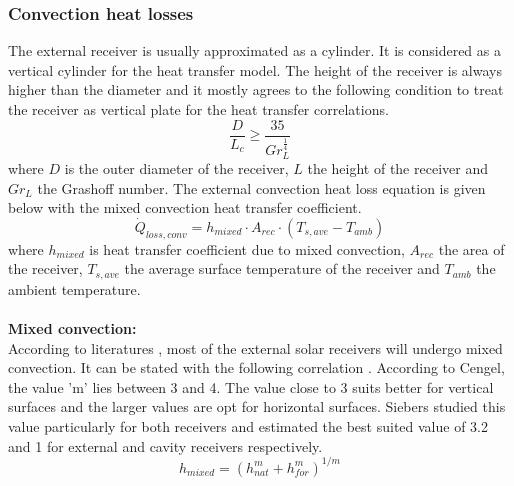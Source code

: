 \subsubsection{Convection heat losses}
The external receiver is usually approximated as a cylinder. It is considered as a vertical cylinder for the heat transfer model. The height of the receiver is always higher than the diameter and it mostly agrees to the following condition to treat the receiver as vertical plate for the heat transfer correlations. 
\begin{equation}
\frac{D}{L_{c}}\ge \frac{35}{Gr_{L}^{\frac{1}{4}}}
\end{equation}
where $D$ is the outer diameter of the receiver, $L$ the height of the receiver and $Gr_{L}$ the Grashoff number. The external convection heat loss equation is given below with the mixed convection heat transfer coefficient. 
\begin{equation}
\dot Q_{loss,conv} = h_{mixed}\cdot A_{rec}\cdot (T_{s,ave}-T_{amb})
\end{equation}
where $h_{mixed}$ is heat transfer coefficient due to mixed convection, $A_{rec}$ the area of the receiver, $T_{s,ave}$ the average surface temperature of the receiver and $T_{amb}$ the ambient temperature.\\\\
\textbf{{Mixed convection:}}\\[0.2cm]
According to literatures \cite{Siebers.1984}, most of the external solar receivers will undergo mixed convection. It can be stated with the following correlation \cite{Cengel.2003} \cite{Siebers.1984}. According to Cengel\cite{Cengel.2003}, the value 'm' lies between 3 and 4. The value close to 3 suits better for vertical surfaces and the larger values are opt for horizontal surfaces. Siebers \cite{Siebers.1984} studied this value particularly for both receivers and estimated the best suited value of 3.2 and 1 for external and cavity receivers respectively.
\begin{equation}
h_{mixed} = (h_{nat}^m + h_{for}^m)^{1/m}
\end{equation}

